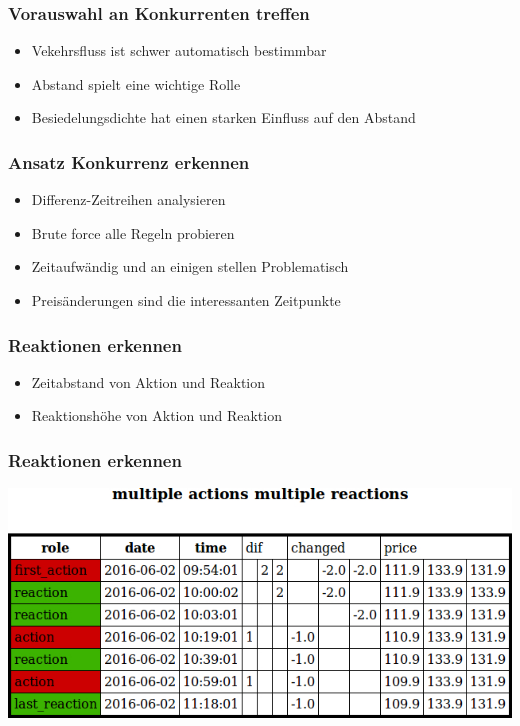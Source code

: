 \documentclass[hyperref={pdfpagelabels=false}]{beamer}
\begin{document}
\begin{frame}
\frametitle{Vorauswahl an Konkurrenten treffen}
\begin{itemize}
\item Vekehrsfluss ist schwer automatisch bestimmbar
\item Abstand spielt eine wichtige Rolle
\item Besiedelungsdichte hat einen starken Einfluss auf den Abstand
\end{itemize}
\end{frame}

\begin{frame}
\frametitle{Ansatz Konkurrenz erkennen}
\begin{itemize}
\item Differenz-Zeitreihen analysieren
\item Brute force alle Regeln probieren 
\item Zeitaufwändig und an einigen stellen Problematisch
\item Preisänderungen sind die interessanten Zeitpunkte
\end{itemize}
\end{frame}

\begin{frame}
\frametitle{Reaktionen erkennen}
\begin{itemize}
\item Zeitabstand von Aktion und Reaktion
\item Reaktionshöhe von Aktion und Reaktion
\end{itemize}
\end{frame}

\begin{frame}
\frametitle{Reaktionen erkennen}
\begin{center}
\includegraphics[scale=0.30]{mamr.jpg}
\end{center}
\end{frame}
\end{document}
